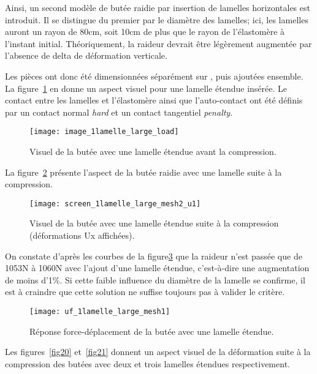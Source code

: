 ﻿ \documentclass{article}
\newcommand{\abaqus}{\bsc{Abaqus}\xspace}
\begin{document}
Ainsi, un second modèle de butée raidie par insertion de lamelles horizontales est introduit. Il se distingue du premier par le diamètre des lamelles; ici, les lamelles auront un rayon de 80cm, soit 10cm de plus que le rayon de l'élastomère à l'instant initial. Théoriquement, la raideur devrait être légèrement augmentée par l'absence de delta de déformation verticale.

Les pièces ont donc été dimensionnées séparément sur \abaqus, puis ajoutées ensemble. La figure~\ref{fig17} en donne un aspect visuel pour une lamelle étendue insérée. Le contact entre les lamelles et l'élastomère ainsi que l'auto-contact ont été définis par un contact normal \textit{hard} et un contact tangentiel \textit{penalty}.

\begin{figure}[!h]
	\centering
	\texttt{[image: image\_1lamelle\_large\_load]}
	\caption{Visuel de la butée avec une lamelle étendue avant la compression.}
	\label{fig17}
\end{figure}

La figure~\ref{fig18} présente l'aspect de la butée raidie avec une lamelle suite à la compression.

\begin{figure}[!h]
	\centering
	\texttt{[image: screen\_1lamelle\_large\_mesh2\_u1]}
	\caption{Visuel de la butée avec une lamelle étendue suite à la compression (déformations Ux affichées).}
	\label{fig18}
\end{figure}

On constate d'après les courbes de la figure\ref{fig19} que la raideur n'est passée que de 1053N à 1060N avec l'ajout d'une lamelle étendue, c'est-à-dire une augmentation de moins d'1\%. Si cette faible influence du diamètre de la lamelle se confirme, il est à craindre que cette solution ne suffise toujours pas à valider le critère.

\begin{figure}[!h]
	\centering
	\texttt{[image: uf\_1lamelle\_large\_mesh1]}
	\caption{Réponse force-déplacement de la butée avec une lamelle étendue.}
	\label{fig19}
\end{figure}

Les figures~\ref{fig20} et~\ref{fig21} donnent un aspect visuel de la déformation suite à la compression des butées avec deux et trois lamelles étendues respectivement.
\end{document}

